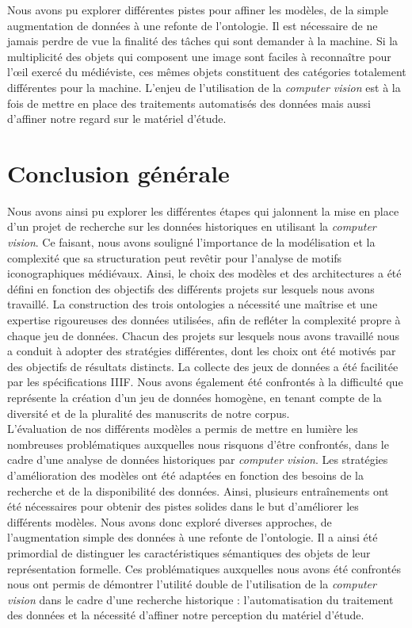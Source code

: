 \documentclass[12pt,twoside]{book}
\begin{document}
Nous avons pu explorer différentes pistes pour affiner les modèles, de la simple augmentation de données à une refonte de l’ontologie. Il est nécessaire de ne jamais perdre de vue la finalité des tâches qui sont demander à la machine. Si la multiplicité des objets qui composent une image sont faciles à reconnaître pour l'œil exercé du médiéviste, ces mêmes objets constituent des catégories totalement différentes pour la machine. L’enjeu de l’utilisation de la \textit{computer vision} est à la fois de mettre en place des traitements automatisés des données mais aussi d’affiner notre regard sur le matériel d’étude. 


\chapter*{Conclusion générale}

Nous avons ainsi pu explorer les différentes étapes qui jalonnent la mise en place d'un projet de recherche sur les données historiques en utilisant la \textit{computer vision}. Ce faisant, nous avons souligné l'importance de la modélisation et la complexité que sa structuration peut revêtir pour l’analyse de motifs iconographiques médiévaux. Ainsi, le choix des modèles et des architectures a été défini en fonction des objectifs des différents projets sur lesquels nous avons travaillé. La construction des trois ontologies a nécessité une maîtrise et une expertise rigoureuses des données utilisées, afin de refléter la complexité propre à chaque jeu de données. Chacun des projets sur lesquels nous avons travaillé nous a conduit à adopter des stratégies différentes, dont les choix ont été motivés par des objectifs de résultats distincts. La collecte des jeux de données a été facilitée par les spécifications IIIF. Nous avons également été confrontés à la difficulté que représente la création d’un jeu de données homogène, en tenant compte de la diversité et de la pluralité des manuscrits de notre corpus. \\

L'évaluation de nos différents modèles a permis de mettre en lumière les nombreuses problématiques auxquelles nous risquons d’être confrontés, dans le cadre d’une analyse de données historiques par \textit{computer vision}. Les stratégies d'amélioration des modèles ont été adaptées en fonction des besoins de la recherche et de la disponibilité des données. Ainsi, plusieurs entraînements ont été nécessaires pour obtenir des pistes solides dans le but d’améliorer les différents modèles. Nous avons donc exploré diverses approches, de l'augmentation simple des données à une refonte de l'ontologie. Il a ainsi été primordial de distinguer les caractéristiques sémantiques des objets de leur représentation formelle. Ces problématiques auxquelles nous avons été confrontés nous ont permis de démontrer l’utilité double de l'utilisation de la \textit{computer vision} dans le cadre d’une recherche historique : l’automatisation du traitement des données et la nécessité d’affiner notre perception du matériel d'étude. \\
\end{document}
